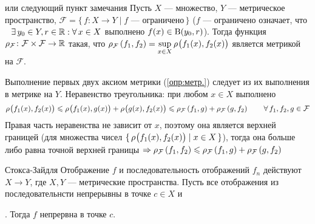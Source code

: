 \begin{lem}[https://www.youtube.com/live/oGN0SkfpZME?si=v9AomZJHSzhlMvMm&t=10556]{или следующий пункт замечания}\label{метр.для отобр.}
	Пусть $X$ --- множество, $Y$ --- метрическое пространство,\quad 
	$\mathcal F = \{\, f \colon X \to Y \mid f\text{ --- ограничено}\,\}$ \linebreak 
	({\small$f$ --- ограничено означает, что$\E y_0 \in Y, r \in \rr : \A x \in X$ выполнено $f(x) \in \B{y_0, r}$}). 
	Тогда функция $\rho_{\mathcal F} \colon \mathcal{F} \times \mathcal{F} \to \rr$ такая, что 
	$\metr[\mathcal F]{f_1, f_2} = \sup\limits_{x \in X} \bmetr{f_1(x), f_2(x)}$ 
	является метрикой на $\mathcal F$.
\end{lem} %
	
\begin{prf} %
	Выполнение \smallskip первых двух аксиом метрики (\ref{опр:метр.}) следует из их выполнения в метрике на $Y$. Неравенство треугольника: при любом $x \in X$ выполнено
	\[\bmetr{f_1(x), f_2(x)} \< \bmetr{f_1(x), g(x)} + \bmetr{g(x), f_2(x)} \< \metr[\mathcal F]{f_1, g} + \metr[\mathcal F]{g, f_2} \qquad \A f_1, f_2, g \in \mathcal F\]
	Правая часть неравенства не зависит от $x$, поэтому она является верхней границей (для множества чисел $\{\,\bmetr{f_1(x), f_2(x)} \mid x \in X\,\}$), тогда она больше \smallskip либо равна точной верхней границы  $\Rightarrow \metr[\mathcal F]{f_1, f_2} \< \metr[\mathcal F]{f_1, g} + \metr[\mathcal F]{g, f_2}$
\end{prf} %

\begin{teor}[https://www.youtube.com/live/oGN0SkfpZME?si=rzyEi2Hd6nOeRw-i&t=11638]{Стокса-Зайдля}\label{ст-зд}
	Отображение $f$ и последовательность отображений $f_n$ действуют $X \to Y$, где $X, Y$ --- метрические пространства. Пусть все отображения из последовательнсти непрерывны в точке $c \in X$ и\!. Тогда $f$ непрервна в точке $c$.
\end{teor} %

